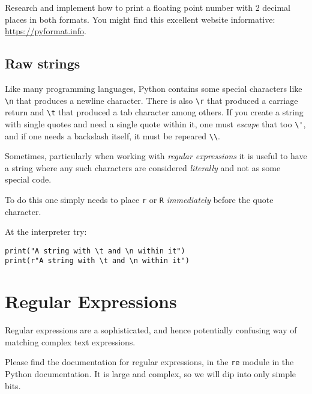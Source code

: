 \documentclass[12pt,oneside]{cttutorial}
\begin{document}
Research and implement how to print a floating point number with 2 decimal places in both formats. You might find
this excellent website informative: \url{https://pyformat.info}.


\subsection{Raw strings}

Like many programming languages, Python contains some special characters like \lstinline!\n! that produces a newline character. There is also \lstinline!\r! that produced a carriage return and \lstinline!\t! that produced a tab character among others. If you create a string with single quotes and need a single quote within it, one must \emph{escape} that too \lstinline!\'!, and if one needs a backslash itself, it must be repeared \lstinline!\\!.

Sometimes, particularly when working with \emph{regular expressions} it is useful to have a string where any such characters are considered \emph{literally} and not as some special code.

To do this one simply needs to place \lstinline!r! or \lstinline!R! \emph{immediately} before the quote character.

At the interpreter try:

\begin{lstlisting}
print("A string with \t and \n within it")
print(r"A string with \t and \n within it")
\end{lstlisting}


\section{Regular Expressions}

Regular expressions are a sophisticated, and hence potentially confusing way of matching complex text expressions.


Please find the documentation for regular expressions, in the \lstinline!re! module in the Python documentation. It is large and complex, so we will dip into only simple bits.
\end{document}
